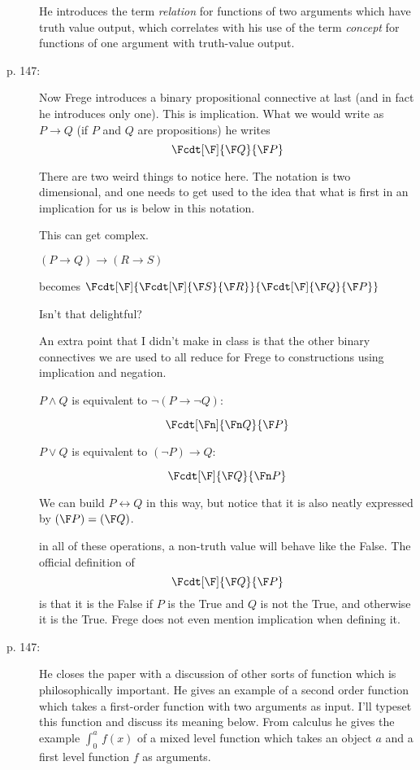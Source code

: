\documentclass[12pt]{article}
\begin{document}
\begin{description}
He introduces the term {\em relation\/} for functions of two arguments which have truth value output, which correlates with his use of the term {\em concept\/} for functions of one argument with truth-value output.

\item[p. 147:]  Now Frege introduces a binary propositional connective at last (and in fact he introduces only one).  This is implication.  What we would write as
$P \rightarrow Q$ (if $P$ and $Q$ are propositions) he writes $$\Fcdt[\F]{\F Q}{\F P}$$

There are two weird things to notice here.  The notation is two dimensional, and one needs to get used to the idea that what is first in an implication for us is below in this notation.

This can get complex.

$(P \rightarrow Q) \rightarrow (R \rightarrow S)$

becomes $\Fcdt[\F]{\Fcdt[\F]{\F S}{\F R}}{\Fcdt[\F]{\F Q}{\F P}}$

Isn't that delightful?

An extra point that I didn't make in class is that the other binary connectives we are used to all reduce for Frege to constructions using implication and negation.

$P \wedge Q$ is equivalent to $\neg(P \rightarrow \neg Q)$:

$$\Fcdt[\Fn]{\Fn Q}{\F P}$$

$P \vee Q$ is equivalent to $(\neg P) \rightarrow Q$:

$$\Fcdt[\F]{\F Q}{\Fn P}$$

We can build $P \leftrightarrow Q$ in this way, but notice that it is also neatly expressed by $(\F P) = (\F Q)$.

in all of these operations, a non-truth value will behave like the False.  The official definition of $$\Fcdt[\F]{\F Q}{\F P}$$ is that it is the False if $P$ is the True
and $Q$ is not the True, and otherwise it is the True.  Frege does not even mention implication when defining it.

\item[p. 147:]  He closes the paper with a discussion of other sorts of function which is philosophically important. He gives an example of a second order function which takes a first-order function with two arguments as input.  I'll typeset this function and discuss its meaning below.  From calculus he gives the example $\int_0^a\,f(x)$ of a mixed level function
which takes an object $a$ and a first level function $f$ as arguments.


\end{description}
\end{document}
